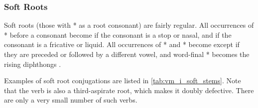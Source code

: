 \documentclass[grammar]{subfiles}
\begin{document}
\subsubsection{Soft Roots}
\label{sssec:vm_i_soft}

Soft roots (those with * as a root consonant) are fairly regular.  All
occurrences of * before a consonant become  if the consonant is a
stop or nasal, and  if the consonant is a fricative or liquid.  All
occurrences of * and * become  except if they are
preceded or followed by a different vowel, and word-final * becomes the
rising diphthongs . 

Examples of soft root conjugations are listed in \cref{tab:vm_i_soft_stems}.
Note that the verb  is also a third-aspirate root, which makes it
doubly defective.  There are only a very small number of such verbs.  
\end{document}
